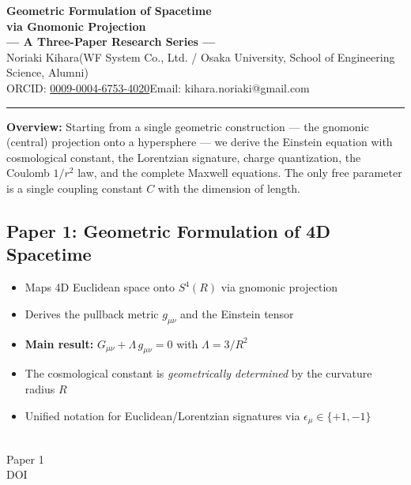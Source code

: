 \documentclass[11pt,a4paper]{article}
\begin{document}
\begin{center}
{\Large\bfseries Geometric Formulation of Spacetime\\via Gnomonic Projection}\\[8pt]
{\large\bfseries --- A Three-Paper Research Series ---}\\[12pt]
{\normalsize Noriaki Kihara\quad (WF System Co., Ltd. / Osaka University, School of Engineering Science, Alumni)}\\[3pt]
{\small ORCID: \href{https://orcid.org/0009-0004-6753-4020}{0009-0004-6753-4020}\qquad Email: kihara.noriaki@gmail.com}
\end{center}

\vspace{6pt}
\hrule
\vspace{8pt}

\noindent\textbf{Overview:}
Starting from a single geometric construction --- the gnomonic (central) projection onto a hypersphere --- we derive the Einstein equation with cosmological constant, the Lorentzian signature, charge quantization, the Coulomb $1/r^2$ law, and the complete Maxwell equations. The only free parameter is a single coupling constant $C$ with the dimension of length.

\vspace{10pt}

\noindent\begin{minipage}[t]{0.82\textwidth}
\subsection*{Paper 1: Geometric Formulation of 4D Spacetime}
\vspace{-6pt}
\begin{itemize}
\item Maps 4D Euclidean space onto $S^4(R)$ via gnomonic projection
\item Derives the pullback metric $g_{\mu\nu}$ and the Einstein tensor
\item \textbf{Main result:} $G_{\mu\nu} + \Lambda\, g_{\mu\nu} = 0$ with $\Lambda = 3/R^2$
\item The cosmological constant is \emph{geometrically determined} by the curvature radius $R$
\item Unified notation for Euclidean/Lorentzian signatures via $\epsilon_\mu \in \{+1,-1\}$
\end{itemize}
\end{minipage}%
\hfill
\begin{minipage}[t]{0.15\textwidth}
\vspace{0pt}
\centering
{}\\[3pt]
{\scriptsize Paper 1\\DOI}
\end{minipage}
\end{document}
